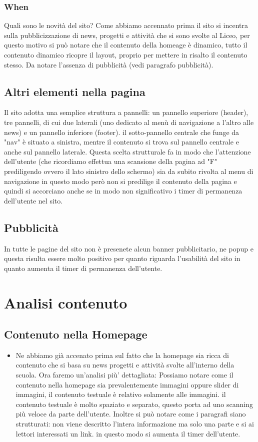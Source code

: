 \documentclass[12pt]{article}
\begin{document}
\subsubsection{When} Quali sono le novit\`a del sito?
Come abbiamo accennato prima il sito si incentra sulla pubblicizzazione di news, progetti e attivit\`a che si sono svolte al Liceo, per questo motivo si pu\`o notare che il contenuto della homeage \`e dinamico, tutto il contenuto dinamico ricopre il layout, proprio per mettere in risalto il contenuto stesso. Da notare l'assenza di pubblicit\`a (vedi paragrafo pubblicit\`a).

\newpage
\subsection{Altri elementi nella pagina}
Il sito adotta una semplice struttura a pannelli: un pannello superiore (header), tre pannelli, di cui due laterali (uno dedicato al men\`u di navigazione a l'altro alle news) e un pannello inferiore (footer).  il sotto-pannello centrale che funge da "nav" \`e situato a sinistra, mentre il contenuto si trova sul pannello centrale e anche sul pannello laterale.
 Questa scelta strutturale fa in modo che l'attenzione dell'utente (che ricordiamo effettua una scansione della pagina ad "F" prediligendo ovvero il lato sinistro dello schermo) sia da subito rivolta al menu di navigazione in questo modo per\`o non si predilige il contenuto della pagina e quindi si accorciano anche se in modo non significativo i timer di permanenza dell'utente nel sito.

\subsection{Pubblicit\`a}
In tutte le pagine del sito non \`e presenete alcun banner pubblicitario, ne popup e questa risulta essere molto positivo per quanto riguarda l'usabilit\`a del sito in quanto aumenta il timer di permanenza dell'utente.

\newpage
\section{Analisi contenuto}
\subsection{Contenuto nella Homepage}
\begin{itemize}
	\item Ne abbiamo gi\`a accenato prima sul fatto che la homepage sia ricca di contenuto che si basa su news progetti e attivit\`a svolte all'interno della scuola. Ora faremo un'analisi pi\`u' dettagliata:
	Possiamo notare come il contenuto nella homepage sia prevalentemente immagini oppure slider di immagini, il contenuto testuale \`e relativo solamente alle immagini. il contenuto testuale \`e  molto spaziato e separato, questo porta ad uno scanning pi\`u  veloce da parte dell'utente. Inoltre si pu\`o  notare come i paragrafi siano strutturati:
	non viene descritto l'intera informazione ma solo una parte e si ai lettori interessati un link. in questo modo si aumenta il timer dell'utente.	 
\end{itemize}
\end{document}
